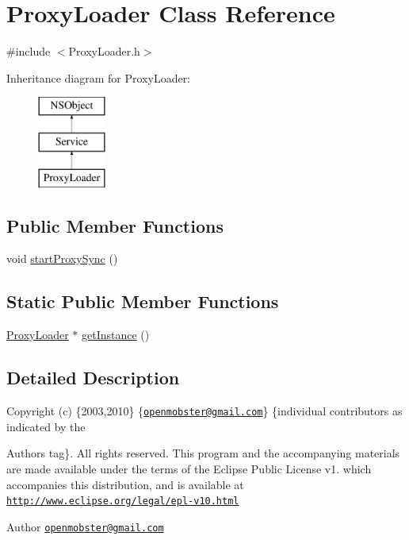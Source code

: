 \hypertarget{interface_proxy_loader}{
\section{\-Proxy\-Loader \-Class \-Reference}
\label{interface_proxy_loader}
}


{\ttfamily \#include $<$\-Proxy\-Loader.\-h$>$}

\-Inheritance diagram for \-Proxy\-Loader\-:\begin{figure}[H]
\begin{center}
\leavevmode
\includegraphics[height=3.000000cm]{interface_proxy_loader}
\end{center}
\end{figure}
\subsection*{\-Public \-Member \-Functions}
\begin{DoxyCompactItemize}
\item 
void \hyperlink{interface_proxy_loader_a25ade6b11f7637d1b5200cbfa86f266b}{start\-Proxy\-Sync} ()
\end{DoxyCompactItemize}
\subsection*{\-Static \-Public \-Member \-Functions}
\begin{DoxyCompactItemize}
\item 
\hyperlink{interface_proxy_loader}{\-Proxy\-Loader} $\ast$ \hyperlink{interface_proxy_loader_a8ed83d004fa4d99adae1dd7e8e653649}{get\-Instance} ()
\end{DoxyCompactItemize}


\subsection{\-Detailed \-Description}
\-Copyright (c) \{2003,2010\} \{\href{mailto:openmobster@gmail.com}{\tt openmobster@gmail.\-com}\} \{individual contributors as indicated by the \begin{DoxyAuthor}{\-Authors}
tag\}. \-All rights reserved. \-This program and the accompanying materials are made available under the terms of the \-Eclipse \-Public \-License v1. which accompanies this distribution, and is available at \href{http://www.eclipse.org/legal/epl-v10.html}{\tt http\-://www.\-eclipse.\-org/legal/epl-\/v10.\-html}
\end{DoxyAuthor}
\begin{DoxyAuthor}{\-Author}
\href{mailto:openmobster@gmail.com}{\tt openmobster@gmail.\-com} 
\end{DoxyAuthor}



